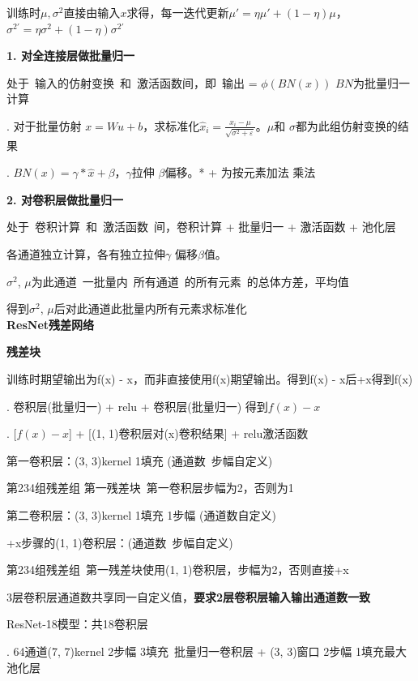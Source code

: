 \documentclass[UTF8]{ctexart}
\begin{document}
  \quad 训练时$\mu, \sigma^2$直接由输入$x$求得，每一迭代更新$\mu' = \eta\mu' + (1 - \eta)\mu$，$\sigma^{2'} = \eta\sigma^2 + (1 - \eta)\sigma^{2'}$

  \textbf{1. 对全连接层做批量归一}

  \quad 处于\ 输入的仿射变换\ 和\ 激活函数间，即\ 输出 = $\phi (BN(x))$ $BN$为批量归一计算

  . 对于批量仿射 $x = Wu + b$，求标准化$\hat{x}_i = \frac{{x_i} - \mu}{\sqrt{\sigma^2 + \varepsilon }}$。$\mu $和 $\sigma$都为此组仿射变换的结果

  . $BN(x) = \gamma * \hat{x} + \beta $，$\gamma$拉伸 $\beta$偏移。* + 为按元素加法 乘法

  \textbf{2. 对卷积层做批量归一}

  \quad 处于\ 卷积计算\ 和\ 激活函数\ 间，卷积计算 + 批量归一 + 激活函数 + 池化层

  \quad 各通道独立计算，各有独立拉伸$\gamma$ 偏移$\beta$值。
  
  \quad $\sigma^2$, $\mu$为此通道\ 一批量内\ 所有通道\ 的所有元素\ 的总体方差，平均值

  \quad 得到$\sigma^2$, $\mu$后对此通道此批量内所有元素求标准化\\
\textbf{ResNet残差网络}

  \textbf{残差块}

  \quad 训练时期望输出为f(x) - x，而非直接使用f(x)期望输出。得到f(x) - x后+x得到f(x)

  . 卷积层(批量归一) + relu + 卷积层(批量归一) 得到$f(x) - x$
  
  . [$f(x) - x$] + [(1, 1)卷积层对(x)卷积结果] + relu激活函数
  
  \quad \quad 第一卷积层：(3, 3)kernel 1填充 (通道数\ 步幅自定义)

  \quad \quad \quad 第234组残差组 第一残差块\ 第一卷积层步幅为2，否则为1

  \quad \quad 第二卷积层：(3, 3)kernel 1填充 1步幅 (通道数自定义)

  \quad \quad +x步骤的(1, 1)卷积层：(通道数\ 步幅自定义) 

  \quad \quad \quad 第234组残差组\ 第一残差块使用(1, 1)卷积层，步幅为2，否则直接+x

  \quad \quad 3层卷积层通道数共享同一自定义值，\textbf{要求2层卷积层输入输出通道数一致}

  ResNet-18模型：共18卷积层

  . 64通道(7, 7)kernel 2步幅 3填充\ 批量归一卷积层 + (3, 3)窗口 2步幅 1填充最大池化层
\end{document}
